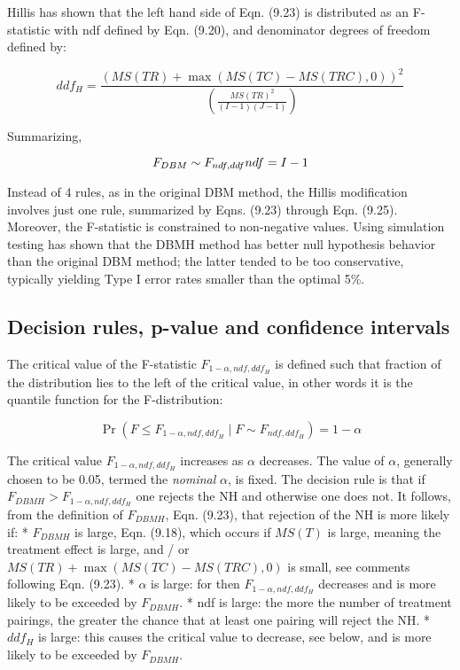 \documentclass[
]{book}
\begin{document}
Hillis has shown that the left hand side of Eqn. (9.23) is distributed as an F-statistic with ndf defined by Eqn. (9.20), and denominator degrees of freedom defined by:

\begin{equation}
ddf_H =\frac{\left ( MS(TR) + \max \left (MS(TC) - MS(TRC),0  \right ) \right )^2}{\left ( \frac{MS(TR)^2}{(I-1)(J-1)}  \right )}
\label{eq:ddfH}
\end{equation}

Summarizing,

\begin{equation}
F_{DBM} \sim F_{ndf,ddf} \\
ndf=I-1
\label{eq:samplingFStatHillis}
\end{equation}

Instead of 4 rules, as in the original DBM method, the Hillis modification involves just one rule, summarized by Eqns. (9.23) through Eqn. (9.25). Moreover, the F-statistic is constrained to non-negative values. Using simulation testing \citep{RN1866} has shown that the DBMH method has better null hypothesis behavior than the original DBM method; the latter tended to be too conservative, typically yielding Type I error rates smaller than the optimal 5\%.

\hypertarget{decision-rules-p-value-and-confidence-intervals}{%
\subsection{Decision rules, p-value and confidence intervals}\label{decision-rules-p-value-and-confidence-intervals}}

The critical value of the F-statistic \(F_{1-\alpha,ndf,ddf_H}\) is defined such that fraction of the distribution lies to the left of the critical value, in other words it is the quantile function for the F-distribution:

\begin{equation}
\Pr\left ( F\leq F_{1-\alpha,ndf,ddf_H} \mid F\sim F_{ndf,ddf_H}\right ) = 1 - \alpha
\label{eq:critValFStat}
\end{equation}

The critical value \(F_{1-\alpha,ndf,ddf_H}\) increases as \(\alpha\) decreases. The value of \(\alpha\), generally chosen to be 0.05, termed the \emph{nominal} \(\alpha\), is fixed. The decision rule is that if \(F_{DBMH} > F_{1-\alpha, ndf, ddf_H}\) one rejects the NH and otherwise one does not. It follows, from the definition of \(F_{DBMH}\), Eqn. (9.23), that rejection of the NH is more likely if:
* \(F_{DBMH}\) is large, Eqn. (9.18), which occurs if \(MS(T)\) is large, meaning the treatment effect is large, and / or \(MS(TR) + \max \left (MS(TC) - MS(TRC),0 \right )\) is small, see comments following Eqn. (9.23).
* \(\alpha\) is large: for then \(F_{1-\alpha,ndf,ddf_H}\) decreases and is more likely to be exceeded by \(F_{DBMH}\).
* ndf is large: the more the number of treatment pairings, the greater the chance that at least one pairing will reject the NH.
* \(ddf_H\) is large: this causes the critical value to decrease, see below, and is more likely to be exceeded by \(F_{DBMH}\).
\end{document}
